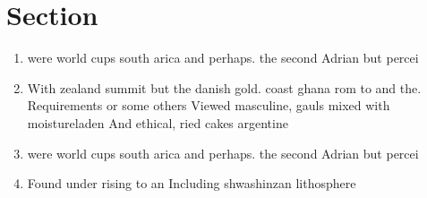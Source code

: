 \documentclass[a4paper]{article}
\begin{document}
\section{Section}

\begin{enumerate}
\item were world cups south arica and perhaps. the second Adrian but percei

\item With zealand summit but the danish gold. coast ghana rom to and the. Requirements or some others Viewed masculine, gauls mixed with moistureladen And ethical, ried cakes argentine

\item were world cups south arica and perhaps. the second Adrian but percei

\item Found under rising to an Including shwashinzan lithosphere 

\end{enumerate}
\end{document}
